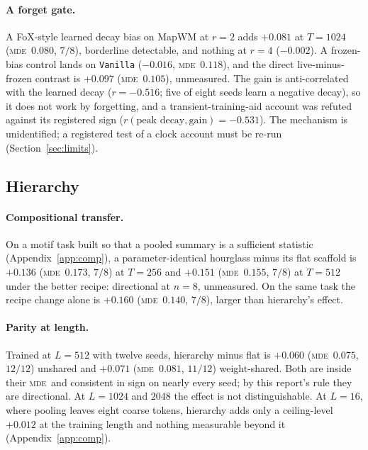 \documentclass[10pt]{article}
\newcommand{\mde}{\textsc{mde}}
\newcommand{\arm}[1]{\texttt{#1}}
\begin{document}
\paragraph{A forget gate.} A FoX-style learned decay bias on MapWM at $r=2$ adds $+0.081$ at $T=1024$
(\mde\ $0.080$, $7/8$), borderline detectable, and nothing at $r=4$ ($-0.002$). A frozen-bias control
lands on \arm{Vanilla} ($-0.016$, \mde\ $0.118$), and the direct live-minus-frozen contrast is $+0.097$
(\mde\ $0.105$), unmeasured. The gain is anti-correlated with the learned decay ($r=-0.516$; five of eight
seeds learn a negative decay), so it does not work by forgetting, and a transient-training-aid account
was refuted against its registered sign ($r(\text{peak decay},\text{gain})=-0.531$). The mechanism is
unidentified; a registered test of a clock account must be re-run (Section~\ref{sec:limits}).

\subsection{Hierarchy}
\label{sec:c5-hier}

\paragraph{Compositional transfer.} On a motif task built so that a pooled summary is a sufficient
statistic (Appendix~\ref{app:comp}), a parameter-identical hourglass minus its flat scaffold is $+0.136$
(\mde\ $0.173$, $7/8$) at $T=256$ and $+0.151$ (\mde\ $0.155$, $7/8$) at $T=512$ under the better recipe:
directional at $n=8$, unmeasured. On the same task the recipe change alone is $+0.160$ (\mde\ $0.140$,
$7/8$), larger than hierarchy's effect. %

\paragraph{Parity at length.} Trained at $L=512$ with twelve seeds, hierarchy minus flat is $+0.060$ (\mde\
$0.075$, $12/12$) unshared and $+0.071$ (\mde\ $0.081$, $11/12$) weight-shared. Both are inside their
\mde\ and consistent in sign on nearly every seed; by this report's rule they are directional. At $L=1024$
and $2048$ the effect is not distinguishable. At $L=16$, where pooling leaves eight coarse tokens,
hierarchy adds only a ceiling-level $+0.012$ at the training length and nothing measurable beyond it
(Appendix~\ref{app:comp}). %
\end{document}
